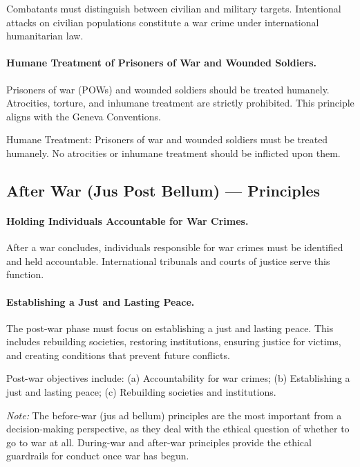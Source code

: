 \begin{CriticalPoint}
Combatants must distinguish between civilian and military targets. Intentional attacks on civilian populations constitute a war crime under international humanitarian law.
\end{CriticalPoint}

\paragraph{Humane Treatment of Prisoners of War and Wounded Soldiers.} Prisoners of war (POWs) and wounded soldiers should be treated humanely. Atrocities, torture, and inhumane treatment are strictly prohibited. This principle aligns with the Geneva Conventions.

\begin{KeyConcept}
Humane Treatment: Prisoners of war and wounded soldiers must be treated humanely. No atrocities or inhumane treatment should be inflicted upon them.
\end{KeyConcept}

\subsection{After War (Jus Post Bellum) --- Principles}

\paragraph{Holding Individuals Accountable for War Crimes.} After a war concludes, individuals responsible for war crimes must be identified and held accountable. International tribunals and courts of justice serve this function.

\paragraph{Establishing a Just and Lasting Peace.} The post-war phase must focus on establishing a just and lasting peace. This includes rebuilding societies, restoring institutions, ensuring justice for victims, and creating conditions that prevent future conflicts.

\begin{KeyConcept}
Post-war objectives include: (a) Accountability for war crimes; (b) Establishing a just and lasting peace; (c) Rebuilding societies and institutions.
\end{KeyConcept}

\textit{Note:} The before-war (jus ad bellum) principles are the most important from a decision-making perspective, as they deal with the ethical question of whether to go to war at all. During-war and after-war principles provide the ethical guardrails for conduct once war has begun.

